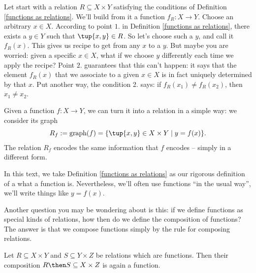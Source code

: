 Let start with a relation $R \subseteq X \times Y$ satisfying the conditions of Definition \ref{functions as relations}.  We'll build from it a function $f_R : X \rightarrow Y$. Choose an arbitrary $x \in X$. According to point $1.$ in Definition \ref{functions as relations}, there exists a $y \in Y$ such that $\tup{x,y} \in R$. So let's choose such a $y$, and call it $f_R(x)$. This gives us recipe to get from any $x$ to a $y$. But maybe you are worried: given a specific $x \in X$, what if we choose $y$ differently each time we apply the recipe? Point $2.$ guarantees that this can't happen: it says that the element $f_R(x)$ that we associate to a given $x \in X$ is in fact uniquely determined by that $x$. Put another way, the condition 2. says: if $f_R(x_1) \neq f_R(x_2)$, then $x_1 \neq x_2$.

Given a function $f : X \rightarrow Y$, we can turn it into a relation in a simple way: we consider its graph
$$
R_f := \text{graph}(f) = \{ \tup{x,y} \in X \times Y \mid y = f(x) \}.
$$
The relation $R_f$ encodes the same information that $f$ encodes -- simply in a different form.

In this text, we take Definition \ref{functions as relations} as our rigorous definition of a what a function is. Nevertheless, we'll often use functions ``in the usual way'',  we'll write things like $y = f(x)$.

Another question you may be wondering about is this: if we define functions as special kinds of relations, how then do we define the composition of functions? The answer is that we compose functions simply by the rule for composing relations. 

\begin{lemma}
\label{lemma:comprelfun}
Let $R \subseteq X \times Y$ and $S \subseteq Y \times Z$ be relations which are functions. Then their composition 
$R \then S \subseteq X \times Z$ is again a function.
\end{lemma}

